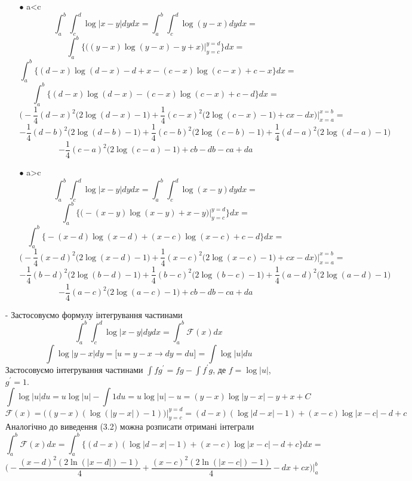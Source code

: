 \documentclass[12pt]{report}
\begin{document}
\begin{itemize}
\begin{itemize}
			\item[$\bullet$] a<c
			$$\int_{a}^{b}\int_{c}^{d}\log\big| x-y \big| dydx=\int_{a}^{b}\int_{c}^{d}\log(y-x)dydx=$$
			$$\int_{a}^{b}\Bigg\{\big((y-x)\log(y-x)-y+x\big)\Bigg|_{y=c}^{y=d}\Bigg\}dx=$$
			$$\int_{a}^{b}\Bigg\{(d-x)\log(d-x)-d+x-(c-x)\log(c-x)+c-x\Bigg\}dx=$$
			$$\int_{a}^{b}\Bigg\{(d-x)\log(d-x)-(c-x)\log(c-x)+c-d\Bigg\}dx=$$
			$$\Bigg(-\frac{1}{4}(d-x)^2\big(2\log(d-x)-1\big)+\frac{1}{4}(c-x)^2\big(2\log(c-x)-1\big)+cx-dx\Bigg)\Bigg|_{x=a}^{x=b}=$$
			$$-\frac{1}{4}(d-b)^2\big(2\log(d-b)-1\big)+\frac{1}{4}(c-b)^2\big(2\log(c-b)-1\big)+\frac{1}{4}(d-a)^2\big(2\log(d-a)-1\big)$$$$-\frac{1}{4}(c-a)^2\big(2\log(c-a)-1\big)+cb-db-ca+da$$
			\item[$\bullet$] a>c
			$$\int_{a}^{b}\int_{c}^{d}\log\big| x-y \big|dydx=\int_{a}^{b}\int_{c}^{d}\log(x-y)dydx=$$
			$$\int_{a}^{b}\Bigg\{\big(-(x-y)\log(x-y)+x-y\big)\Bigg|_{y=c}^{y=d}\Bigg\}dx=$$
			$$\int_{a}^{b}\Bigg\{-(x-d)\log(x-d)+(x-c)\log(x-c)+c-d\Bigg\}dx=$$
			$$\Bigg(-\frac{1}{4}(x-d)^2\big(2\log(x-d)-1\big)+\frac{1}{4}(x-c)^2\big(2\log(x-c)-1\big)+cx-dx\Bigg)\Bigg|_{x=a}^{x=b}=$$
			$$-\frac{1}{4}(b-d)^2\big(2\log(b-d)-1\big)+\frac{1}{4}(b-c)^2\big(2\log(b-c)-1\big)+\frac{1}{4}(a-d)^2\big(2\log(a-d)-1\big)$$$$-\frac{1}{4}(a-c)^2\big(2\log(a-c)-1\big)+cb-db-ca+da$$
		\end{itemize}
	\item[-] Застосовуємо формулу інтегрування частинами
		$$\int_{a}^{b}\int_{c}^{d}\log\big| x-y \big|dydx=\int_{a}^{b}\mathcal{F}(x)dx$$
		$$\int\log\big| y-x \big|dy = \big[u=y-x\rightarrow dy=du\big]=\int\log| u|du$$
		Застосовуємо інтегрування частинами $\int fg^\prime = fg-\int f^\prime g$, де $f=\log|u|$, $g^\prime =1$.
		$$\int\log| u|du = u\log|u|-\int 1du = u\log|u|-u = (y-x)\log\big|y-x\big|-y+x+C$$
		$$\mathcal{F}(x)=\Bigg(\left(y-x\right)\left(\log\left(\left|y-x\right|\right)-1\right)\Bigg)\Bigg|_{y=c}^{y=d}=\left(d-x\right)\left(\log\left|d-x\right|-1\right)+(x-c)\log|x-c|-d+c$$
		Аналогічно до виведення (3.2) можна розписати отримані інтеграли
		$$\int_{a}^{b}\mathcal{F}(x)dx = \int_{a}^{b}\Bigg\{\left(d-x\right)\left(\log\left|d-x\right|-1\right)+(x-c)\log|x-c|-d+c\Bigg\}dx =$$
		$$\Bigg(-\dfrac{\left(x-d\right)^2\left(2\ln\left(\left|x-d\right|\right)-1\right)}{4}+\dfrac{\left(x-c\right)^2\left(2\ln\left(\left|x-c\right|\right)-1\right)}{4}-dx+cx\Bigg)\Bigg|_{a}^{b}$$
		\end{itemize}
\end{document}
